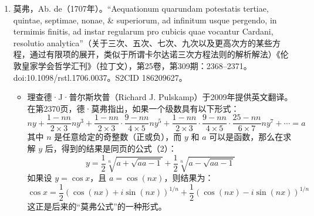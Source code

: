 \begin{enumerate}
\item 莫弗，Ab. de（1707年）。“Aequationum quarundam potestatis tertiae, quintae, septimae, nonae, & superiorum, ad infinitum usque pergendo, in termimis finitis, ad instar regularum pro cubicis quae vocantur Cardani, resolutio analytica”（关于三次、五次、七次、九次以及更高次方的某些方程，通过有限项的展开，类似于所谓卡尔达诺三次方程法则的解析解法）《伦敦皇家学会哲学汇刊》（拉丁文），第25卷，第309期：2368–2371。doi:10.1098/rstl.1706.0037。S2CID 186209627。
\begin{itemize}
\item 理查德·J·普尔斯坎普（Richard J. Pulskamp）于2009年提供英文翻译。
在第2370页，德·莫弗指出，如果一个级数具有以下形式：
$$
ny + \frac{1 - nn}{2 \times 3}ny^3 + \frac{1 - nn}{2 \times 3} \cdot \frac{9 - nn}{4 \times 5}ny^5 + \frac{1 - nn}{2 \times 3} \cdot \frac{9 - nn}{4 \times 5} \cdot \frac{25 - nn}{6 \times 7}ny^7 + \cdots = a~
$$
其中 $n$ 是任意给定的奇整数（正或负），而 $y$ 和 $a$ 可以是函数，那么在求解 $y$ 后，得到的结果是同页的公式（2）：
$$
y = \frac{1}{2} \sqrt[n]{a + \sqrt{aa - 1}} + \frac{1}{2} \sqrt[n]{a - \sqrt{aa - 1}}~
$$
如果设 $y = \cos x$，且 $a = \cos(nx)$，则结果为：
$$
\cos x = \frac{1}{2}(\cos(nx) + i \sin(nx))^{1/n} + \frac{1}{2}(\cos(nx) - i \sin(nx))^{1/n}~
$$
这正是后来的“莫弗公式”的一种形式。
\end{itemize}

\end{enumerate}